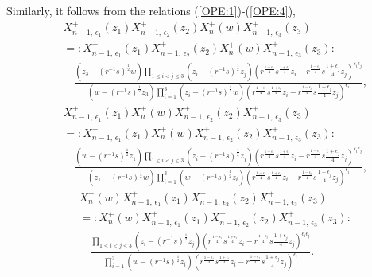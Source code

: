 \documentclass{amsproc}
\theoremstyle{remark}
\numberwithin{equation}{section}
\begin{document}
Similarly, it follows from the relations (\ref{OPE:1})-(\ref{OPE:4}),
\begin{eqnarray*}
&&X_{n-1,\,{\epsilon}_1}^+(z_1)X_{n-1,\,{\epsilon}_2}^+(z_2)X^+_{n}(w)X_{n-1,\,{\epsilon}_3}^+(z_3)\\
&&=:X_{n-1,\,{\epsilon}_1}^+(z_1)X_{n-1,\,{\epsilon}_2}^+(z_2)X^+_{n}(w)X_{n-1,\,{\epsilon}_3}^+(z_3):\\
&&\quad \frac{(z_3-(r^{-1}s)^{\frac{1}{2}}w)\prod_{1\leqslant i<j\leqslant 3}(z_i-(r^{-1}s)^{\frac{1}{2}}z_j)
(r^{\frac{1-{\epsilon}_i}{4}}s^{\frac{1+{\epsilon}_i}{4}}z_i-r^{\frac{1-{\epsilon}_j}{4}}s{\frac{1+{\epsilon}_j}{4}}z_j)^{{\epsilon}_i{\epsilon}_j}}
{(w-(r^{-1}s)^{\frac{1}{2}}z_3)
\prod_{i=1}^{3}(z_i-(r^{-1}s)^{\frac{1}{2}}w)
(r^{\frac{1-{\epsilon}_i}{4}}s^{\frac{1+{\epsilon}_i}{4}}z_i-r^{\frac{1-{\epsilon}_j}{4}}s{\frac{1+{\epsilon}_j}{4}}z_j)^{{\epsilon}_i}},
\end{eqnarray*}
\begin{eqnarray*}
&&X_{n-1,\,{\epsilon}_1}^+(z_1)X^+_{n}(w)X_{n-1,\,{\epsilon}_2}^+(z_2)X_{n-1,\,{\epsilon}_3}^+(z_3)\\
&&=:X_{n-1,\,{\epsilon}_1}^+(z_1)X^+_{n}(w)X_{n-1,\,{\epsilon}_2}^+(z_2)X_{n-1,\,{\epsilon}_3}^+(z_3):\\
&&\quad \frac{(w-(r^{-1}s)^{\frac{1}{2}}z_1)\prod_{1\leqslant i<j\leqslant 3}(z_i-(r^{-1}s)^{\frac{1}{2}}z_j)
(r^{\frac{1-{\epsilon}_i}{4}}s^{\frac{1+{\epsilon}_i}{4}}z_i-r^{\frac{1-{\epsilon}_j}{4}}s{\frac{1+{\epsilon}_j}{4}}z_j)^{{\epsilon}_i{\epsilon}_j}}
{(z_1-(r^{-1}s)^{\frac{1}{2}}w)\prod_{i=1}^{3}(w-(r^{-1}s)^{\frac{1}{2}}z_i)
(r^{\frac{1-{\epsilon}_i}{4}}s^{\frac{1+{\epsilon}_i}{4}}z_i-r^{\frac{1-{\epsilon}_j}{4}}s{\frac{1+{\epsilon}_j}{4}}z_j)^{{\epsilon}_i}},
\end{eqnarray*}
\begin{eqnarray*}
&&X^+_{n}(w)X_{n-1,\,{\epsilon}_1}^+(z_1)X_{n-1,\,{\epsilon}_2}^+(z_2)X_{n-1,\,{\epsilon}_3}^+(z_3)\\
&&=:X^+_{n}(w)X_{n-1,\,{\epsilon}_1}^+(z_1)X_{n-1,\,{\epsilon}_2}^+(z_2)X_{n-1,\,{\epsilon}_3}^+(z_3):\\
&&\quad \frac{\prod_{1\leqslant i<j\leqslant 3}(z_i-(r^{-1}s)^{\frac{1}{2}}z_j)
(r^{\frac{1-{\epsilon}_i}{4}}s^{\frac{1+{\epsilon}_i}{4}}z_i-r^{\frac{1-{\epsilon}_j}{4}}s{\frac{1+{\epsilon}_j}{4}}z_j)^{{\epsilon}_i{\epsilon}_j}}
{\prod_{i=1}^{3}(w-(r^{-1}s)^{\frac{1}{2}}z_i)
(r^{\frac{1-{\epsilon}_i}{4}}s^{\frac{1+{\epsilon}_i}{4}}z_i-r^{\frac{1-{\epsilon}_j}{4}}s{\frac{1+{\epsilon}_j}{4}}z_j)^{{\epsilon}_i}}.
\end{eqnarray*}
\end{document}

